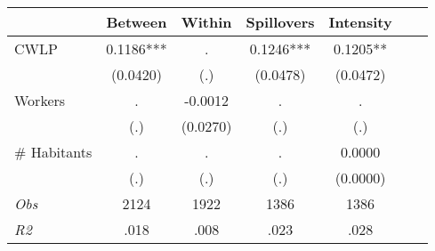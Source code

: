 \begin{tabular}{l*{6}{c}}\hline&\multicolumn{1}{c}{Between}&\multicolumn{1}{c}{Within}&\multicolumn{1}{c}{Spillovers}&\multicolumn{1}{c}{Intensity}\\ \hline 
CWLP & 0.1186*** & . & 0.1246*** & 0.1205** \\
 & (0.0420) & (.) & (0.0478) & (0.0472) \\
Workers & . & -0.0012 & . & . \\
 & (.) & (0.0270) & (.) & (.) \\
\# Habitants & . & . & . & 0.0000 \\
  & (.) & (.) & (.) & (0.0000) \\
\hline \textit{Obs} & 2124 & 1922 & 1386 & 1386  \\ \textit{R2} & .018 & .008 & .023 & .028 \\ \hline \end{tabular}
